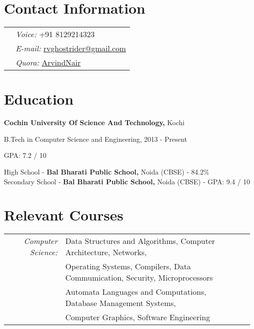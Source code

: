 \documentclass[margin,line]{res}
\newenvironment{list1}{
  \begin{list}{\ding{113}}{%
      \setlength{\itemsep}{0in}
      \setlength{\parsep}{0in} \setlength{\parskip}{0in}
      \setlength{\topsep}{0in} \setlength{\partopsep}{0in} 
      \setlength{\leftmargin}{0.17in}}}{\end{list}}
\begin{document}

\begin{resume}
\section{\sc Contact Information}
\vspace{.05in}
\begin{tabular}{@{}p{2in}p{8in}}
             & {\it Voice:}  +91 8129214323 \\              & {\it E-mail:}  \href{mailto:rvghostrider@gmail.com}{rvghostrider@gmail.com} \\
             &{\it Quora:} \href{https://www.quora.com/profile/Arvind-Nair}{ArvindNair}
   
\end{tabular}

\section{\sc Education}
{\bf  Cochin University Of Science And Technology, }Kochi \\
\vspace*{-.1in}
\begin{list1}
\item[] B.Tech in Computer Science and Engineering,  2013 - Present
\item[] GPA: 7.2 / 10
\end{list1}
High School - {\bf Bal Bharati Public School, }Noida (CBSE) - 84.2\% \\ 
Secondary School - {\bf Bal Bharati Public School, }Noida (CBSE) -  GPA: 9.4 / 10 \\

\section{\sc Relevant Courses}

\begin{tabular}{rlp{5cm}}

\em{Computer Science:} & Data Structures and Algorithms, Computer Architecture, Networks,
\\ & Operating Systems, Compilers, Data Commumication, Security, Microprocessors 
\\ & Automata Languages and Computations, Database Management Systems, 
\\ & Computer Graphics, Software Engineering \\


\end{tabular}
\end{resume}
\end{document}
